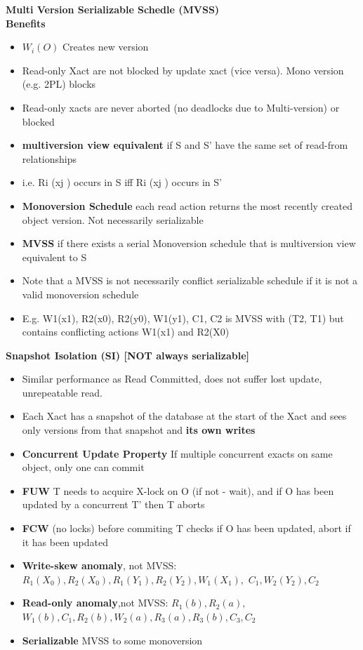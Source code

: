 \documentclass[10pt, landscape]{article}
\begin{document}
\begin{multicols}{4}
\textbf{Multi Version Serializable Schedle (MVSS)} \\
\textbf{Benefits} \\
\begin{itemize}
  \item $W_i(O)$ Creates new version
  \item Read-only Xact are not blocked by update xact (vice versa). Mono version (e.g. 2PL) blocks
  \item Read-only xacts are never aborted (no deadlocks due to Multi-version) or blocked
\end{itemize}

\begin{itemize}
  \item \textbf{multiversion view equivalent} if S and S' have the same set of read-from relationships
  \item i.e. Ri (xj ) occurs in S iff Ri (xj ) occurs in S'
  \item \textbf{Monoversion Schedule} each read action returns the most recently created object version. Not necessarily serializable
  \item \textbf{MVSS} if there exists a serial Monoversion schedule that is multiversion view equivalent to S
  \item Note that a MVSS is not necessarily conflict serializable schedule if it is not a valid monoversion schedule
  \item E.g. W1(x1), R2(x0), R2(y0), W1(y1), C1, C2 is MVSS with (T2, T1) but contains conflicting actions W1(x1) and R2(X0)
\end{itemize}

\textbf{Snapshot Isolation (SI) [NOT always serializable]} \\
\begin{itemize}
  \item Similar performance as Read Committed, does not suffer lost update, unrepeatable read.
  \item Each Xact has a snapshot of the database at the start of the Xact and sees only versions from that snapshot and \textbf{its own writes}
  \item \textbf{Concurrent Update Property} If multiple concurrent exacts on same object, only one can commit
  \item \textbf{FUW} T needs to acquire X-lock on O (if not - wait), and if O has been updated by a concurrent T' then T aborts
  \item \textbf{FCW} (no locks) before commiting T checks if O has been updated, abort if it has been updated
  \item \textbf{Write-skew anomaly}, not MVSS: $R_1(X_0), R_2(X_0), R_1(Y_1), R_2(Y_2), W_1(X_1),$ $ C_1, W_2(Y_2), C_2$
  \item \textbf{Read-only anomaly},not MVSS: $R_1(b), R_2(a),$\\$ W_1(b), C_1, R_2(b), W_2(a),R_3(a), R_3(b), C_3, C_2$
  \item \textbf{Serializable} MVSS to some monoversion
\end{itemize}


\end{multicols}
\end{document}
